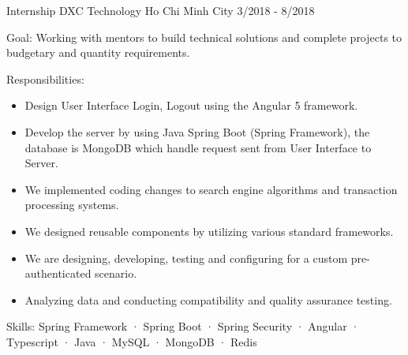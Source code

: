   \cventry
    {Internship} %
    {DXC Technology} %
    {Ho Chi Minh City} %
    {3/2018 - 8/2018} %
    {
      \begin{cvitems} %
        \item {Goal: Working with mentors to build technical solutions and complete projects to budgetary and quantity requirements.}
        \item {Responsibilities: }
        {
            \begin{itemize} %
                \item {Design User Interface Login, Logout using the Angular 5 framework.}
                \item {Develop the server by using Java Spring Boot (Spring Framework), the database is MongoDB which handle request sent from User Interface to Server.}
                \item {We implemented coding changes to search engine algorithms and transaction processing systems.}
                \item {We designed reusable components by utilizing various standard frameworks.}
                \item {We are designing, developing, testing and configuring for a custom pre-authenticated scenario.}
                \item {Analyzing data and conducting compatibility and quality assurance testing.}
            \end{itemize}
        }
        \item {Skills: Spring Framework · Spring Boot · Spring Security · Angular · Typescript · Java · MySQL · MongoDB · Redis}
      \end{cvitems}
    }
